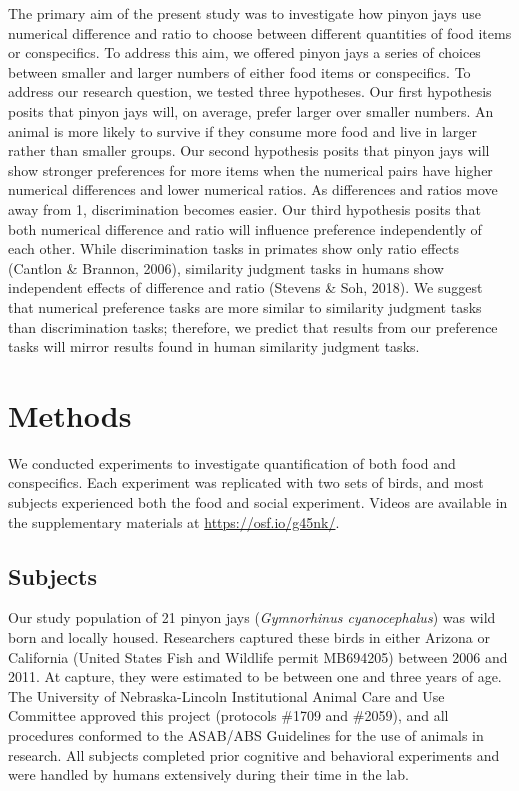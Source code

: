 \documentclass[
  ,pub,floatsintext]{apa6}
\begin{document}
The primary aim of the present study was to investigate how pinyon jays use numerical difference and ratio to choose between different quantities of food items or conspecifics. To address this aim, we offered pinyon jays a series of choices between smaller and larger numbers of either food items or conspecifics. To address our research question, we tested three hypotheses. Our first hypothesis posits that pinyon jays will, on average, prefer larger over smaller numbers. An animal is more likely to survive if they consume more food and live in larger rather than smaller groups. Our second hypothesis posits that pinyon jays will show stronger preferences for more items when the numerical pairs have higher numerical differences and lower numerical ratios. As differences and ratios move away from 1, discrimination becomes easier. Our third hypothesis posits that both numerical difference and ratio will influence preference independently of each other. While discrimination tasks in primates show only ratio effects (Cantlon \& Brannon, 2006), similarity judgment tasks in humans show independent effects of difference and ratio (Stevens \& Soh, 2018). We suggest that numerical preference tasks are more similar to similarity judgment tasks than discrimination tasks; therefore, we predict that results from our preference tasks will mirror results found in human similarity judgment tasks.

\hypertarget{methods}{%
\section{Methods}\label{methods}}

We conducted experiments to investigate quantification of both food and conspecifics. Each experiment was replicated with two sets of birds, and most subjects experienced both the food and social experiment. Videos are available in the supplementary materials at \url{https://osf.io/g45nk/}.

\hypertarget{subjects}{%
\subsection{Subjects}\label{subjects}}

Our study population of 21 pinyon jays (\emph{Gymnorhinus cyanocephalus}) was wild born and locally housed. Researchers captured these birds in either Arizona or California (United States Fish and Wildlife permit MB694205) between 2006 and 2011. At capture, they were estimated to be between one and three years of age. The University of Nebraska-Lincoln Institutional Animal Care and Use Committee approved this project (protocols \#1709 and \#2059), and all procedures conformed to the ASAB/ABS Guidelines for the use of animals in research. All subjects completed prior cognitive and behavioral experiments and were handled by humans extensively during their time in the lab.
\end{document}
